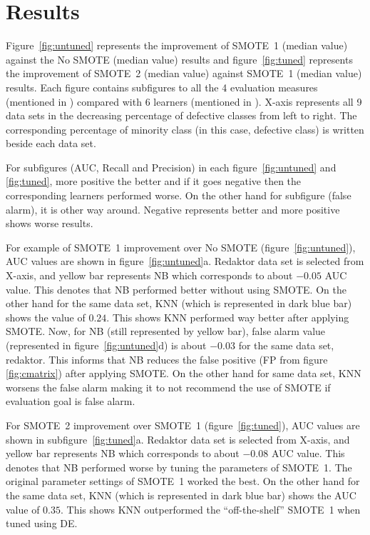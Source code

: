 \section{Results}
\label{sect:results}
Figure~\ref{fig:untuned} represents the improvement of SMOTE~1 (median value) against the No SMOTE (median value) results and figure~\ref{fig:tuned} represents the improvement of SMOTE~2 (median value) against SMOTE~1 (median value) results. Each figure contains subfigures to all the 4 evaluation measures (mentioned in ) compared with 6 learners (mentioned in ). X-axis represents all 9 data sets in the decreasing percentage of defective classes from left to right. The corresponding percentage of minority class (in this case, defective class) is written beside each data set. 

For subfigures (AUC, Recall and Precision) in each figure~\ref{fig:untuned} and \ref{fig:tuned}, more positive the better and if it goes negative then the corresponding learners performed worse. On the other hand for subfigure (false alarm), it is other way around. Negative represents better and more positive shows worse results. 

For example of SMOTE~1 improvement over No SMOTE (figure~\ref{fig:untuned}), AUC values are shown in figure~\ref{fig:untuned}a. Redaktor data set is selected from X-axis, and yellow bar represents NB which corresponds to about $-0.05$ AUC value. This denotes that NB performed better without using SMOTE. On the other hand for the same data set, KNN (which is represented in dark blue bar) shows the value of $0.24$. This shows KNN performed way better after applying SMOTE. Now, for NB (still represented by yellow bar), false alarm value (represented in figure~\ref{fig:untuned}d) is about $-0.03$ for the same data set, redaktor. This informs that NB reduces the false positive (FP from figure \ref{fig:cmatrix}) after applying SMOTE. On the other hand for same data set, KNN worsens the false alarm making it to not recommend the use of SMOTE if evaluation goal is false alarm.

For SMOTE~2 improvement over SMOTE~1 (figure~\ref{fig:tuned}), AUC values are shown in subfigure~\ref{fig:tuned}a. Redaktor data set is selected from X-axis, and yellow bar represents NB which corresponds to about $-0.08$ AUC value. This denotes that NB performed worse by tuning the parameters of SMOTE~1. The original parameter settings of SMOTE~1 worked the best. On the other hand for the same data set, KNN (which is represented in dark blue bar) shows the AUC value of $0.35$. This shows KNN outperformed the ``off-the-shelf'' SMOTE~1 when tuned using DE.

